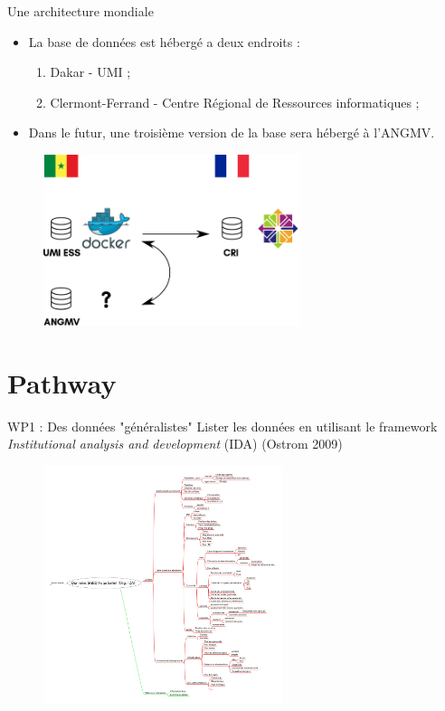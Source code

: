 \documentclass[newPxFont]{beamer}
\begin{document}
\begin{frame}[c]{Une architecture mondiale}
\vspace{-1cm}
\begin{itemize}
	\item La base de données est hébergé a deux endroits :
	\begin{enumerate}
		\item Dakar - UMI ;
		\item Clermont-Ferrand - Centre Régional de Ressources informatiques ;
	\end{enumerate}
	\item Dans le futur, une troisième version de la base sera hébergé à l'ANGMV.
\end{itemize}
\begin{figure}
	\centering
	\includegraphics[height=5cm]{img/sch_database}
\end{figure}
\end{frame}


\section{Pathway}


\begin{frame}[c]{WP1 : Des données "généralistes"}
\vspace{-2em}
Lister les données en utilisant le framework \textit{Institutional analysis and development} (IDA) (Ostrom 2009)
\vspace{-1em}
\begin{figure}
	\centering
	\includegraphics[width = 7cm]{img/IDA_data_org}
\end{figure}
\end{frame}
\end{document}
